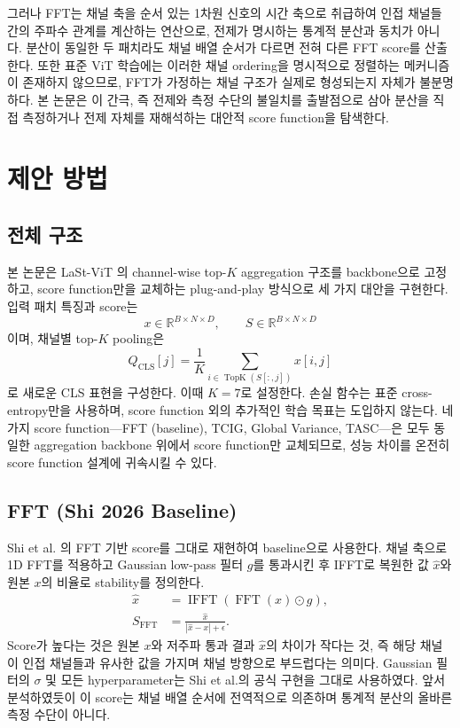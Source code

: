 \documentclass[10pt,twocolumn,letterpaper]{article}
\begin{document}
그러나 FFT는 채널 축을 순서 있는 1차원 신호의 시간 축으로 취급하여 인접 채널들 간의 주파수 관계를 계산하는 연산으로, 전제가 명시하는 통계적 분산과 동치가 아니다. 분산이 동일한 두 패치라도 채널 배열 순서가 다르면 전혀 다른 FFT score를 산출한다. 또한 표준 ViT 학습에는 이러한 채널 ordering을 명시적으로 정렬하는 메커니즘이 존재하지 않으므로, FFT가 가정하는 채널 구조가 실제로 형성되는지 자체가 불분명하다. 본 논문은 이 간극, 즉 전제와 측정 수단의 불일치를 출발점으로 삼아 분산을 직접 측정하거나 전제 자체를 재해석하는 대안적 score function을 탐색한다.

\section{제안 방법}

\subsection{전체 구조}

본 논문은 LaSt-ViT \cite{shi2026}의 channel-wise top-$K$ aggregation 구조를 backbone으로 고정하고, score function만을 교체하는 plug-and-play 방식으로 세 가지 대안을 구현한다. 입력 패치 특징과 score는
\begin{equation}
x\in\mathbb{R}^{B\times N\times D},\qquad
S\in\mathbb{R}^{B\times N\times D}
\end{equation}
이며, 채널별 top-$K$ pooling은
\begin{equation}
Q_{\mathrm{CLS}}[j]=\frac{1}{K}
\sum_{i\in\operatorname{TopK}(S[:,j])}x[i,j]
\end{equation}
로 새로운 CLS 표현을 구성한다. 이때 $K=7$로 설정한다. 손실 함수는 표준 cross-entropy만을 사용하며, score function 외의 추가적인 학습 목표는 도입하지 않는다. 네 가지 score function---FFT (baseline), TCIG, Global Variance, TASC---은 모두 동일한 aggregation backbone 위에서 score function만 교체되므로, 성능 차이를 온전히 score function 설계에 귀속시킬 수 있다.


\subsection{FFT (Shi 2026 Baseline)}

Shi et al. \cite{shi2026}의 FFT 기반 score를 그대로 재현하여 baseline으로 사용한다. 채널 축으로 1D FFT를 적용하고 Gaussian low-pass 필터 $g$를 통과시킨 후 IFFT로 복원한 값 $\hat{x}$와 원본 $x$의 비율로 stability를 정의한다.
\begin{align}
\hat{x} &= \operatorname{IFFT}(\operatorname{FFT}(x)\odot g),\\
S_{\mathrm{FFT}} &= \frac{\hat{x}}{|\hat{x}-x|+\epsilon}.
\end{align}
Score가 높다는 것은 원본 $x$와 저주파 통과 결과 $\hat{x}$의 차이가 작다는 것, 즉 해당 채널이 인접 채널들과 유사한 값을 가지며 채널 방향으로 부드럽다는 의미다. Gaussian 필터의 $\sigma$ 및 모든 hyperparameter는 Shi et al.의 공식 구현을 그대로 사용하였다. 앞서 분석하였듯이 이 score는 채널 배열 순서에 전역적으로 의존하며 통계적 분산의 올바른 측정 수단이 아니다.
\end{document}

